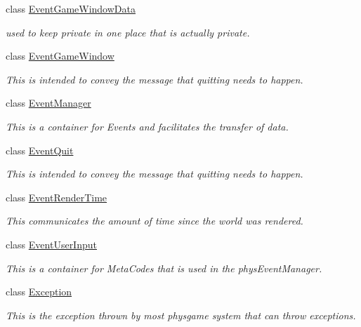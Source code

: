 \begin{DoxyCompactItemize}
class \hyperlink{classphys_1_1EventGameWindowData}{EventGameWindowData}
\begin{DoxyCompactList}\small\item\em used to keep private in one place that is actually private. \item\end{DoxyCompactList}\item 
class \hyperlink{classphys_1_1EventGameWindow}{EventGameWindow}
\begin{DoxyCompactList}\small\item\em This is intended to convey the message that quitting needs to happen. \item\end{DoxyCompactList}\item 
class \hyperlink{classphys_1_1EventManager}{EventManager}
\begin{DoxyCompactList}\small\item\em This is a container for Events and facilitates the transfer of data. \item\end{DoxyCompactList}\item 
class \hyperlink{classphys_1_1EventQuit}{EventQuit}
\begin{DoxyCompactList}\small\item\em This is intended to convey the message that quitting needs to happen. \item\end{DoxyCompactList}\item 
class \hyperlink{classphys_1_1EventRenderTime}{EventRenderTime}
\begin{DoxyCompactList}\small\item\em This communicates the amount of time since the world was rendered. \item\end{DoxyCompactList}\item 
class \hyperlink{classphys_1_1EventUserInput}{EventUserInput}
\begin{DoxyCompactList}\small\item\em This is a container for MetaCodes that is used in the physEventManager. \item\end{DoxyCompactList}\item 
class \hyperlink{classphys_1_1Exception}{Exception}
\begin{DoxyCompactList}\small\item\em This is the exception thrown by most physgame system that can throw exceptions. \item\end{DoxyCompactList}\item 

\end{DoxyCompactItemize}
